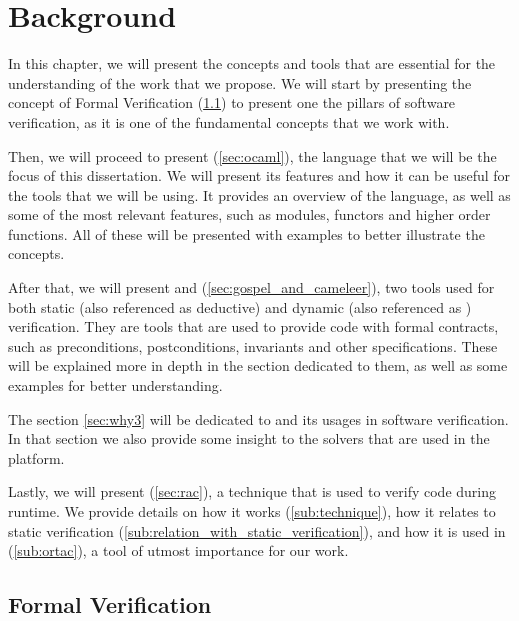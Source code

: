 
%

\chapter{Background}
\label{cha:background}

In this chapter, we will present the concepts and tools that are essential for the 
understanding of the work that we propose. We will start by presenting the concept of 
Formal Verification (\ref{sec:formal_verification}) to present one the pillars of software 
verification, as it is one of the fundamental concepts that we work with. 

Then, we will proceed to present \ocaml (\ref{sec:ocaml}), the language that we will be the 
focus of this dissertation. We will present its features and how it can be useful for the tools 
that we will be using. It provides an overview of the language, as well as some of the most 
relevant features, such as modules, functors and higher order functions. All of these will be 
presented with examples to better illustrate the concepts.

After that, we will present \gospellang and \cameleer (\ref{sec:gospel_and_cameleer}), two tools 
used for both static (also referenced as deductive) and dynamic (also referenced as \rac) verification. 
They are tools that are used to provide \ocaml code with formal contracts, such as preconditions, 
postconditions, invariants and other specifications. These will be explained more in depth in the 
section dedicated to them, as well as some examples for better understanding. 

The section \ref{sec:why3} will be dedicated to \why and its usages in software verification. 
In that section we also provide some insight to the solvers that are used in the platform. 

Lastly, we will present \rac (\ref{sec:rac}), a technique that is used to verify code during runtime. 
We provide details on how it works (\ref{sub:technique}), how it relates to static verification 
(\ref{sub:relation_with_static_verification}), and how it is used in \ortac (\ref{sub:ortac}), a tool 
of utmost importance for our work.

\section{Formal Verification}
\label{sec:formal_verification}

